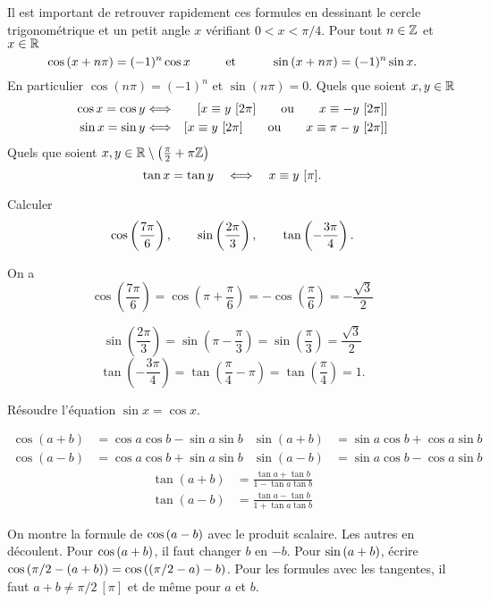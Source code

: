 \documentclass{magnoliaold}
\begin{document}
\begin{remarques}
\remarque Il est important de retrouver rapidement ces formules en dessinant le cercle trigonométrique et un \og petit \fg angle $x$ vérifiant $0<x<\pi/4$.
\remarque Pour tout $n\in\mathbb{Z}$ et $x\in\mathbb{R}$
  \[\cos\left(x+n\pi\right)=(-1)^n \cos x \qquad\quad\!\text{et}\quad\!\qquad \sin\left(x+n\pi\right)=(-1)^n \sin x.\]
  En particulier $\cos(n\pi)=(-1)^n$ et $\sin(n\pi)=0$. 
\remarque Quels que soient $x,y\in\mathbb{R}$
  \begin{eqnarray*}
  \cos x = \cos y &\Longleftrightarrow& \left[x\equiv y \ [2\pi] \qquad\text{ou}\qquad
    x\equiv -y \ [2\pi]\right]\\
  \sin x = \sin y &\Longleftrightarrow& \left[x\equiv y \ [2\pi] \qquad\text{ou}\qquad
    x\equiv \pi-y \ [2\pi]\right]
  \end{eqnarray*}
\remarque Quels que soient $x,y\in\mathbb{R}\setminus\left(\frac{\pi}{2}+\pi\mathbb{Z}\right)$
  \[\tan x=\tan y \quad\ssi\quad x\equiv y\ [\pi].\]
\end{remarques}

\begin{exos}
\exo Calculer
  \[\cos\left(\frac{7\pi}{6}\right), \qquad \sin\left(\frac{2\pi}{3}\right), \qquad
    \tan\left(-\frac{3\pi}{4}\right).\]
  \begin{sol}
  On a
\[\cos\left( \frac{7\pi}{6} \right)=\cos\left( \pi+\frac{\pi}{6} \right)=-\cos\left( \frac{\pi}{6} \right)=-\frac{\sqrt{3}}{2}\]

\[\sin\left( \frac{2\pi}{3} \right)=\sin\left( \pi-\frac{\pi}{3} \right)=\sin\left( \frac{\pi}{3} \right)=\frac{\sqrt{3}}{2}\]
\[\tan\left( -\frac{3\pi}{4}\right) =\tan\left(\frac{\pi}{4}-\pi\right) =\tan\left(\frac{\pi}{4}\right) =1.\]
  \end{sol}
\exo Résoudre l'équation $\sin x=\cos x$.
\end{exos}

\begin{proposition}[nom={Addition des arcs}]
\begin{align*}
\cos(a+b)&=\cos a\cos b-\sin a\sin b &\sin(a+b)&=\sin a\cos b+\cos a\sin b\\
\cos(a-b)&=\cos a\cos b+\sin a\sin b &\sin(a-b)&=\sin a\cos b-\cos a\sin b
\end{align*}
\begin{align*}
\tan(a+b)&=\frac{\tan a+\tan b}{1-\tan a\tan b}\\
\tan(a-b)&=\frac{\tan a-\tan b}{1+\tan a\tan b}
\end{align*}
\end{proposition}
\begin{preuve}
On montre la formule de $\cos\left(a-b\right)$ avec le produit scalaire. Les autres en
découlent. Pour $\cos\left(a+b\right)$, il faut changer $b$ en $-b$. Pour
$\sin\left(a+b\right)$, écrire $\cos\left(\pi/2-\left(a+b\right)\right)=\cos\left(\left(\pi/2-a\right)-b\right)$.
Pour les formules avec les tangentes, il faut $a+b\neq \pi/2\ [\pi]$ et
de même pour $a$ et $b$. 
\end{preuve}
\end{document}
